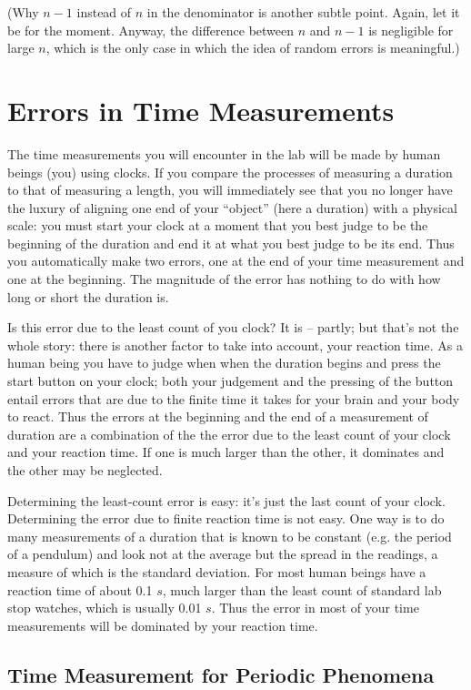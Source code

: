 (Why $n-1$ instead of $n$ in the denominator is another subtle point. Again, let it be for the moment. Anyway, the difference between $n$ and $n-1$ is negligible for large $n$, which is the only case in which the idea of random errors is meaningful.)

\section{Errors in Time Measurements}

The time measurements you will encounter in the lab will be made by human beings (you) using clocks. If you compare the processes of measuring a duration to that of measuring a length, you will immediately see that you no longer have the luxury of aligning one end of your ``object'' (here a duration) with a physical scale: you must start your clock at a moment that you best judge to be the beginning of the duration and end it at what you best judge to be its end. Thus you automatically make two errors, one at the end of your time measurement and one at the beginning. The magnitude of the error has nothing to do with how long or short the duration is. 

Is this error due to the least count of you clock? It is -- partly; but that's not the whole story: there is another factor to take into account, your reaction time. As a human being you have to judge when when the duration begins and press the start button on your clock; both your judgement and the pressing of the button entail errors that are due to the finite time it takes for your brain and your body to react. Thus the errors at the beginning and the end of a measurement of duration are a combination of the the error due to the least count of your clock and your reaction time. If one is much larger than the other, it dominates and the other may be neglected. 

Determining the least-count error is easy: it's just the last count of your clock. Determining the error due to finite reaction time is not easy. One way is to do many measurements of a duration that is known to be constant (e.g. the period of a pendulum) and look not at the average but the spread in the readings, a measure of which is the standard deviation. For most human beings have a reaction time of about 0.1 $s$, much larger than the least count of standard lab stop watches, which is usually 0.01 $s$. Thus the error in most of your time measurements will be dominated by your reaction time. 

\subsection{Time Measurement for Periodic Phenomena}

